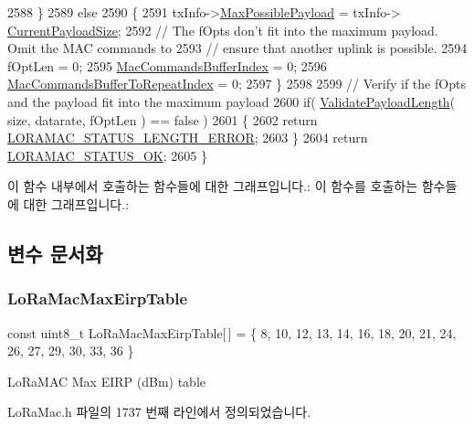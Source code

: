 \begin{DoxyCode}
2588     \}
2589     \textcolor{keywordflow}{else}
2590     \{
2591         txInfo->\mbox{\hyperlink{structs_lo_ra_mac_tx_info_aa2c8329cf5f4dd8fe4b1563a40a3f642}{MaxPossiblePayload}} = txInfo->
      \mbox{\hyperlink{structs_lo_ra_mac_tx_info_afd5874846b1ddb673f84f5f70d1281e2}{CurrentPayloadSize}};
2592         \textcolor{comment}{// The fOpts don't fit into the maximum payload. Omit the MAC commands to}
2593         \textcolor{comment}{// ensure that another uplink is possible.}
2594         fOptLen = 0;
2595         \mbox{\hyperlink{_lo_ra_mac_8c_aef33b9ec32d4536ae8d838ecc03372e3}{MacCommandsBufferIndex}} = 0;
2596         \mbox{\hyperlink{_lo_ra_mac_8c_a44f97c375266b0b4b2e9d5f8fc01c43f}{MacCommandsBufferToRepeatIndex}} = 0;
2597     \}
2598 
2599     \textcolor{comment}{// Verify if the fOpts and the payload fit into the maximum payload}
2600     \textcolor{keywordflow}{if}( \mbox{\hyperlink{_lo_ra_mac_8c_ab496fc8c52b4322c7735a8a38c815c89}{ValidatePayloadLength}}( size, datarate, fOptLen ) == \textcolor{keyword}{false} )
2601     \{
2602         \textcolor{keywordflow}{return} \mbox{\hyperlink{group___l_o_r_a_m_a_c_gga1d18f26b344040b3ec5c3db662919661a4ab40311dcd2eeffc77f573a919b29b1}{LORAMAC\_STATUS\_LENGTH\_ERROR}};
2603     \}
2604     \textcolor{keywordflow}{return} \mbox{\hyperlink{group___l_o_r_a_m_a_c_gga1d18f26b344040b3ec5c3db662919661a03db5fca052313edb3823c014b653a74}{LORAMAC\_STATUS\_OK}};
2605 \}
\end{DoxyCode}
이 함수 내부에서 호출하는 함수들에 대한 그래프입니다.\+:
이 함수를 호출하는 함수들에 대한 그래프입니다.\+:


\subsection{변수 문서화}
\mbox{\label{group___l_o_r_a_m_a_c_ga981ec467711a94cacf1a8bc4b88735ba}} 
\subsubsection{\texorpdfstring{Lo\+Ra\+Mac\+Max\+Eirp\+Table}{LoRaMacMaxEirpTable}}
{\footnotesize\ttfamily const uint8\+\_\+t Lo\+Ra\+Mac\+Max\+Eirp\+Table\mbox{[}$\,$\mbox{]} = \{ 8, 10, 12, 13, 14, 16, 18, 20, 21, 24, 26, 27, 29, 30, 33, 36 \}\hspace{0.3cm}{\ttfamily [static]}}

Lo\+Ra\+M\+AC Max E\+I\+RP (d\+Bm) table 

Lo\+Ra\+Mac.\+h 파일의 1737 번째 라인에서 정의되었습니다.

